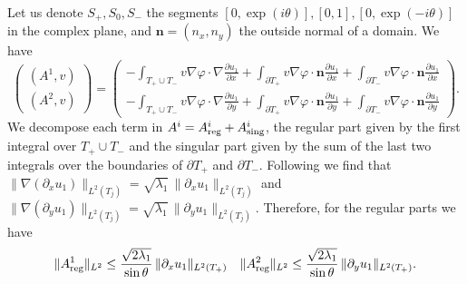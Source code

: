 \documentclass[JEP,XML,SOM,Unicode,ThmDefs,NoFloatCountersInSection,published]{cedram}
\theoremstyle{plain}
\theoremstyle{definition}
\newcommand{\bo}[1]{{\boldsymbol#1}}
\newcommand{\reg}{\textup{reg}}
\newcommand{\sing}{\textup{sing}}
\begin{document}
Let us denote $S_+, S_0, S_-$ the segments $[0,\exp (i \theta)], [0,1], [0,\exp (-i \theta)]$ in the complex plane, and $\bo n=(n_x,n_y)$ the outside normal of a domain. We have
\[
\begin{pmatrix} (A^1,v)\\ (A^2,v) \end{pmatrix} = \begin{pmatrix} - \int_{T_+\cup T_-} v \nabla \varphi \cdot \nabla \frac{\partial u_1}{\partial x} + \int_{\partial T_+} v \nabla \varphi \cdot \bo n \frac{\partial u_1}{\partial x} +\int_{\partial T_-} v \nabla \varphi \cdot \bo n \frac{\partial u_1}{\partial x} \\[5pt] - \int_{T_+\cup T_-} v \nabla \varphi \cdot \nabla \frac{\partial u_1}{\partial y} + \int_{\partial T_+} v \nabla \varphi \cdot \bo n \frac{\partial u_1}{\partial y} +\int_{\partial T_-} v \nabla \varphi \cdot \bo n \frac{\partial u_1}{\partial y} \end{pmatrix}.
\]
We decompose each term in $A^i=A^i_{\reg}+A^i_{\sing}$, the regular part given by the first integral over $T_+\cup T_-$ and the singular part given by the sum of the last two integrals over the boundaries of $\partial T_+$ and $\partial T_-$. Following \cite[Lem.\,3.4.1.2-3]{grisvard} we find that $\|\nabla(\partial_x u_1)\|_{L^2(T_j)} = \sqrt{\lambda_1}\, \|\partial_x u_1\|_{L^2(T_j)}$ and $\|\nabla(\partial_y u_1)\|_{L^2(T_j)} = \sqrt{\lambda_1}\, \|\partial_y u_1\|_{L^2(T_j)}$. Therefore, for the regular parts we have
\[
\|A^1_{\reg}\|_{L^2} \leq \frac{\sqrt{2\lambda_1}}{\sin \theta}\, \|\partial_x u_1\|_{L^2(T_+)} \quad \|A^2_{\reg}\|_{L^2} \leq \frac{\sqrt{2\lambda_1}}{\sin \theta}\,\|\partial_y u_1\|_{L^2(T_+)}.
\]
\end{document}
